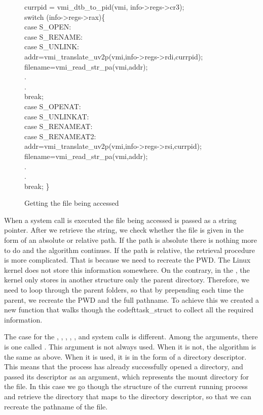 \begin{figure}[ht]
\footnotesize {
	{\selectfont 
\tab currpid = vmi\_dtb\_to\_pid(vmi, info->regs->cr3);\\
\tab switch (info->regs->rax)\{\\
\tab case S\_OPEN:\\
\tab case S\_RENAME:\\
\tab case S\_UNLINK:\\
\tab \tab	addr=vmi\_translate\_uv2p(vmi,info->regs->rdi,currpid);\\
\tab \tab	filename=vmi\_read\_str\_pa(vmi,addr);\\
\tab \tab	.\\
\tab \tab	.\\
\tab \tab	break;\\
\tab case S\_OPENAT:\\
\tab case S\_UNLINKAT:\\
\tab case S\_RENAMEAT:\\
\tab case S\_RENAMEAT2:\\
\tab \tab	addr=vmi\_translate\_uv2p(vmi,info->regs->rsi,currpid);\\
\tab \tab	filename=vmi\_read\_str\_pa(vmi,addr);\\
\tab \tab	.\\
\tab \tab	.\\
\tab \tab	break; \} \\
	}
}
	\caption{Getting the file being accessed}
	\label{fig:getfile}
\end{figure}


\par When a system call is executed the file being accessed is passed as a string pointer. After we retrieve the string, we check whether the file is given in the form of an absolute or relative path. If the path is absolute there is nothing more to do and the algorithm continues. If the path is relative, the retrieval procedure is more complicated. That is because we need to recreate the \ac{PWD}. The Linux kernel does not store this information somewhere. On the contrary, in the , the kernel only stores in another structure only the parent directory. Therefore, we need to loop through the parent folders, so that by prepending each time the parent, we recreate the \ac{PWD} and the full pathname. To achieve this we created a new function that walks though the codeft{task\_struct} to collect all the required information. 

\par The case for the , , , , , and  system calls is different. Among the arguments, there is one called . This argument is not always used. When it is not, the algorithm is the same as above. When it is used, it is in the form of a directory descriptor. This means that the process has already successfully opened a directory, and passed its descriptor as an argument, which represents the mount directory for the file. In this case we go though the  structure of the current running process and retrieve the directory that maps to the directory descriptor, so that we can recreate the pathname of the file.

